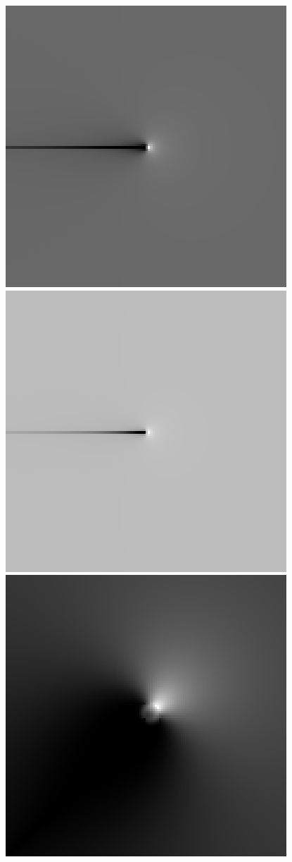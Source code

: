 \begin{figure}
{ \includegraphics[scale=1]{figures/dfilt_wr_sqrt50.png}
 }
 \subbottom
 {
 \includegraphics[scale=1]{figures/dfilt_wr_sqrt200.png}
 }
 \subbottom
 {
 \includegraphics[scale=1]{figures/dfilt_wur_sqrt2.png}
}
\end{figure}
